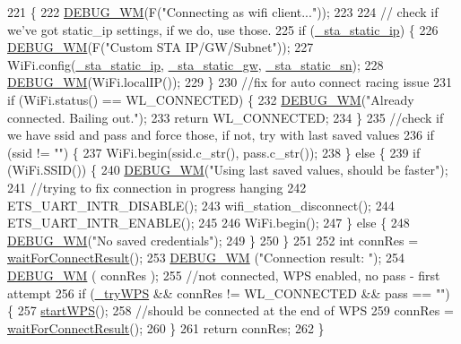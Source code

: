\begin{DoxyCode}
221                                                      \{
222   \hyperlink{class_wi_fi_manager_ae5f595c670ccbcf9a191baf50f5c7c26}{DEBUG\_WM}(F(\textcolor{stringliteral}{"Connecting as wifi client..."}));
223 
224   \textcolor{comment}{// check if we've got static\_ip settings, if we do, use those.}
225   \textcolor{keywordflow}{if} (\hyperlink{class_wi_fi_manager_ad90d356096742a43b4540117b92faff0}{\_sta\_static\_ip}) \{
226     \hyperlink{class_wi_fi_manager_ae5f595c670ccbcf9a191baf50f5c7c26}{DEBUG\_WM}(F(\textcolor{stringliteral}{"Custom STA IP/GW/Subnet"}));
227     WiFi.config(\hyperlink{class_wi_fi_manager_ad90d356096742a43b4540117b92faff0}{\_sta\_static\_ip}, \hyperlink{class_wi_fi_manager_a36648ca4819dc0feedaf9e1987d56d96}{\_sta\_static\_gw}, 
      \hyperlink{class_wi_fi_manager_a3fd337255bce688189f9d450cc0ca3a3}{\_sta\_static\_sn});
228     \hyperlink{class_wi_fi_manager_ae5f595c670ccbcf9a191baf50f5c7c26}{DEBUG\_WM}(WiFi.localIP());
229   \}
230   \textcolor{comment}{//fix for auto connect racing issue}
231   \textcolor{keywordflow}{if} (WiFi.status() == WL\_CONNECTED) \{
232     \hyperlink{class_wi_fi_manager_ae5f595c670ccbcf9a191baf50f5c7c26}{DEBUG\_WM}(\textcolor{stringliteral}{"Already connected. Bailing out."});
233     \textcolor{keywordflow}{return} WL\_CONNECTED;
234   \}
235   \textcolor{comment}{//check if we have ssid and pass and force those, if not, try with last saved values}
236   \textcolor{keywordflow}{if} (ssid != \textcolor{stringliteral}{""}) \{
237     WiFi.begin(ssid.c\_str(), pass.c\_str());
238   \} \textcolor{keywordflow}{else} \{
239     \textcolor{keywordflow}{if} (WiFi.SSID()) \{
240       \hyperlink{class_wi_fi_manager_ae5f595c670ccbcf9a191baf50f5c7c26}{DEBUG\_WM}(\textcolor{stringliteral}{"Using last saved values, should be faster"});
241       \textcolor{comment}{//trying to fix connection in progress hanging}
242       ETS\_UART\_INTR\_DISABLE();
243       wifi\_station\_disconnect();
244       ETS\_UART\_INTR\_ENABLE();
245 
246       WiFi.begin();
247     \} \textcolor{keywordflow}{else} \{
248       \hyperlink{class_wi_fi_manager_ae5f595c670ccbcf9a191baf50f5c7c26}{DEBUG\_WM}(\textcolor{stringliteral}{"No saved credentials"});
249     \}
250   \}
251 
252   \textcolor{keywordtype}{int} connRes = \hyperlink{class_wi_fi_manager_a89a3f33997aa662ad223d6c150c1eede}{waitForConnectResult}();
253   \hyperlink{class_wi_fi_manager_ae5f595c670ccbcf9a191baf50f5c7c26}{DEBUG\_WM} (\textcolor{stringliteral}{"Connection result: "});
254   \hyperlink{class_wi_fi_manager_ae5f595c670ccbcf9a191baf50f5c7c26}{DEBUG\_WM} ( connRes );
255   \textcolor{comment}{//not connected, WPS enabled, no pass - first attempt}
256   \textcolor{keywordflow}{if} (\hyperlink{class_wi_fi_manager_aad7bf8cc9ff4bf7603f9ce42923c9df1}{\_tryWPS} && connRes != WL\_CONNECTED && pass == \textcolor{stringliteral}{""}) \{
257     \hyperlink{class_wi_fi_manager_abcc403fc26a47f7a111d1271f1d0869e}{startWPS}();
258     \textcolor{comment}{//should be connected at the end of WPS}
259     connRes = \hyperlink{class_wi_fi_manager_a89a3f33997aa662ad223d6c150c1eede}{waitForConnectResult}();
260   \}
261   \textcolor{keywordflow}{return} connRes;
262 \}
\end{DoxyCode}
